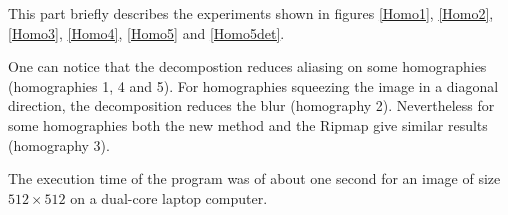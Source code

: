 

This part briefly describes the experiments shown in figures \ref{Homo1}, \ref{Homo2}, \ref{Homo3}, \ref{Homo4}, \ref{Homo5} and \ref{Homo5det}.


One can notice that the decompostion reduces aliasing on some homographies (homographies 1, 4 and 5). For homographies squeezing the image in a diagonal direction, the decomposition reduces the blur (homography 2). Nevertheless for some homographies both the new method and the Ripmap give similar results (homography 3). 



The execution time of the program was of about one second for an image of size $512\times 512$ on a dual-core laptop computer.


